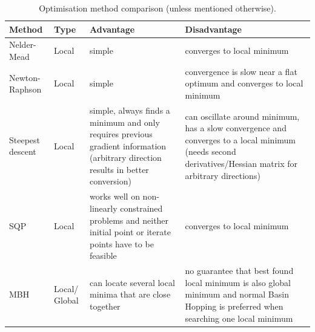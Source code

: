 \begin{longtable}{|p{2.5cm}|p{1.5cm}|p{6cm}|p{6cm}|}
\caption{Optimisation method comparison \cite{noomen2013} (unless mentioned otherwise).}
\label{tab:methcomp}
\endfirsthead
\endhead
\hline 
\textbf{Method} 		& \textbf{Type} & \textbf{Advantage} & \textbf{Disadvantage} \\ \hline \hline

Nelder-Mead		& Local  & simple & converges to local minimum \\ \hline
Newton-Raphson	& Local & simple & convergence is slow near a flat optimum and converges to local minimum \\ \hline
Steepest descent	& Local  & simple, always finds a minimum and only requires previous gradient information (arbitrary direction results in better conversion) & can oscillate around minimum, has a slow convergence and converges to a local minimum (needs second derivatives/Hessian matrix for arbitrary directions) \\ \hline
\ac{SQP} \cite{boggs1995} 	& Local & works well on non-linearly constrained problems and neither initial point or iterate points have to be feasible & converges to local minimum \\ \hline
\ac{MBH}		& Local/ Global & can locate several local minima that are close together \cite{musegaas2012} & no guarantee that best found local minimum is also global minimum and normal Basin Hopping is preferred when searching one local minimum \cite{iwamatsu2004} \\ \hline 


\end{longtable}
